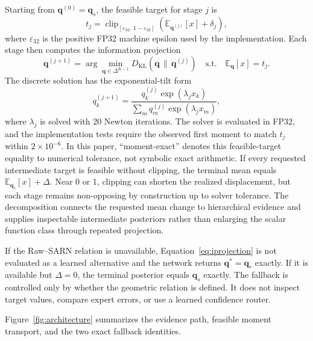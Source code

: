 \documentclass[electronics,article,submit,oneauthor]{Definitions/mdpi}
\begin{document}
Starting from $\mathbf{q}^{(0)}=\mathbf{q}_s$, the feasible target for stage $j$ is
\begin{equation}
t_j=\operatorname{clip}_{[\varepsilon_{32},\,1-\varepsilon_{32}]}
\left(\mathbb{E}_{\mathbf{q}^{(j)}}[x]+\delta_j\right),
\label{eq:feasible_target}
\end{equation}
where $\varepsilon_{32}$ is the positive FP32 machine epsilon used by the implementation. Each stage then computes the information projection
\begin{equation}
\mathbf{q}^{(j+1)}
=\arg\min_{\mathbf{q}\in\Delta^{K-1}}
D_{\mathrm{KL}}\!\left(\mathbf{q}\,\|\,\mathbf{q}^{(j)}\right)
\quad\mathrm{s.t.}\quad
\mathbb{E}_{\mathbf{q}}[x]
=t_j.
\label{eq:iprojection}
\end{equation}
The discrete solution has the exponential-tilt form \cite{csiszar1975idivergence}
\begin{equation}
q_k^{(j+1)}
=\frac{q_k^{(j)}\exp(\lambda_jx_k)}
{\sum_mq_m^{(j)}\exp(\lambda_jx_m)},
\label{eq:exponential_tilt}
\end{equation}
where $\lambda_j$ is solved with 20 Newton iterations. The solver is evaluated in FP32, and the implementation tests require the observed first moment to match $t_j$ within $2\times10^{-6}$. In this paper, ``moment-exact'' denotes this feasible-target equality to numerical tolerance, not symbolic exact arithmetic. If every requested intermediate target is feasible without clipping, the terminal mean equals $\mathbb{E}_{\mathbf{q}_s}[x]+\Delta$. Near 0 or 1, clipping can shorten the realized displacement, but each stage remains non-opposing by construction up to solver tolerance. The decomposition connects the requested mean change to hierarchical evidence and supplies inspectable intermediate posteriors rather than enlarging the scalar function class through repeated projection.

If the Raw--SARN relation is unavailable, Equation~\eqref{eq:iprojection} is not evaluated as a learned alternative and the network returns $\mathbf{q}^{*}=\mathbf{q}_r$ exactly. If it is available but $\Delta=0$, the terminal posterior equals $\mathbf{q}_s$ exactly. The fallback is controlled only by whether the geometric relation is defined. It does not inspect target values, compare expert errors, or use a learned confidence router.

Figure~\ref{fig:architecture} summarizes the evidence path, feasible moment transport, and the two exact fallback identities.
\end{document}
